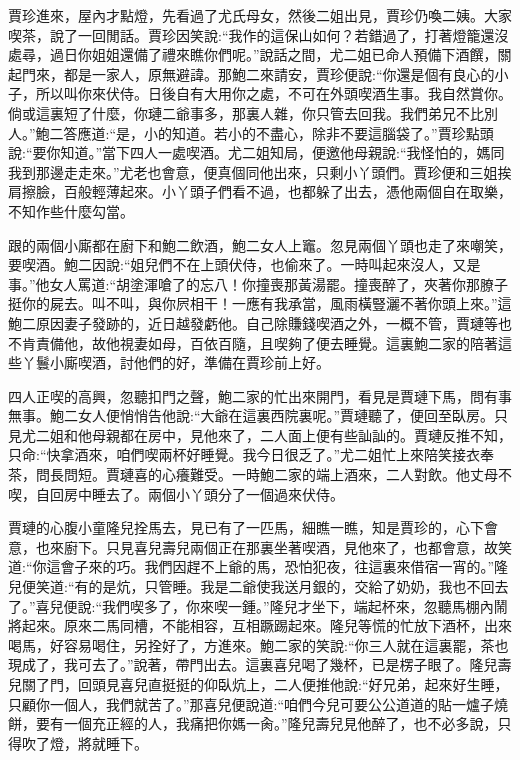 \begin{parag}
    賈珍進來，屋內才點燈，先看過了尤氏母女，然後二姐出見，賈珍仍喚二姨。大家喫茶，說了一回閒話。賈珍因笑說:“我作的這保山如何？若錯過了，打著燈籠還沒處尋，過日你姐姐還備了禮來瞧你們呢。”說話之間，尤二姐已命人預備下酒饌，關起門來，都是一家人，原無避諱。那鮑二來請安，賈珍便說:“你還是個有良心的小子，所以叫你來伏侍。日後自有大用你之處，不可在外頭喫酒生事。我自然賞你。倘或這裏短了什麼，你璉二爺事多，那裏人雜，你只管去回我。我們弟兄不比別人。”鮑二答應道:“是，小的知道。若小的不盡心，除非不要這腦袋了。”賈珍點頭說:“要你知道。”當下四人一處喫酒。尤二姐知局，便邀他母親說:“我怪怕的，媽同我到那邊走走來。”尤老也會意，便真個同他出來，只剩小丫頭們。賈珍便和三姐挨肩擦臉，百般輕薄起來。小丫頭子們看不過，也都躲了出去，憑他兩個自在取樂，不知作些什麼勾當。
\end{parag}


\begin{parag}
    跟的兩個小廝都在廚下和鮑二飲酒，鮑二女人上竈。忽見兩個丫頭也走了來嘲笑，要喫酒。鮑二因說:“姐兒們不在上頭伏侍，也偷來了。一時叫起來沒人，又是事。”他女人罵道:“胡塗渾嗆了的忘八！你撞喪那黃湯罷。撞喪醉了，夾著你那膫子挺你的屍去。叫不叫，與你屄相干！一應有我承當，風雨橫豎灑不著你頭上來。”這鮑二原因妻子發跡的，近日越發虧他。自己除賺錢喫酒之外，一概不管，賈璉等也不肯責備他，故他視妻如母，百依百隨，且喫夠了便去睡覺。這裏鮑二家的陪著這些丫鬟小廝喫酒，討他們的好，準備在賈珍前上好。
\end{parag}


\begin{parag}
    四人正喫的高興，忽聽扣門之聲，鮑二家的忙出來開門，看見是賈璉下馬，問有事無事。鮑二女人便悄悄告他說:“大爺在這裏西院裏呢。”賈璉聽了，便回至臥房。只見尤二姐和他母親都在房中，見他來了，二人面上便有些訕訕的。賈璉反推不知，只命:“快拿酒來，咱們喫兩杯好睡覺。我今日很乏了。”尤二姐忙上來陪笑接衣奉茶，問長問短。賈璉喜的心癢難受。一時鮑二家的端上酒來，二人對飲。他丈母不喫，自回房中睡去了。兩個小丫頭分了一個過來伏侍。
\end{parag}


\begin{parag}
    賈璉的心腹小童隆兒拴馬去，見已有了一匹馬，細瞧一瞧，知是賈珍的，心下會意，也來廚下。只見喜兒壽兒兩個正在那裏坐著喫酒，見他來了，也都會意，故笑道:“你這會子來的巧。我們因趕不上爺的馬，恐怕犯夜，往這裏來借宿一宵的。”隆兒便笑道:“有的是炕，只管睡。我是二爺使我送月銀的，交給了奶奶，我也不回去了。”喜兒便說:“我們喫多了，你來喫一鍾。”隆兒才坐下，端起杯來，忽聽馬棚內鬧將起來。原來二馬同槽，不能相容，互相蹶踢起來。隆兒等慌的忙放下酒杯，出來喝馬，好容易喝住，另拴好了，方進來。鮑二家的笑說:“你三人就在這裏罷，茶也現成了，我可去了。”說著，帶門出去。這裏喜兒喝了幾杯，已是楞子眼了。隆兒壽兒關了門，回頭見喜兒直挺挺的仰臥炕上，二人便推他說:“好兄弟，起來好生睡，只顧你一個人，我們就苦了。”那喜兒便說道:“咱們今兒可要公公道道的貼一爐子燒餅，要有一個充正經的人，我痛把你媽一肏。”隆兒壽兒見他醉了，也不必多說，只得吹了燈，將就睡下。
\end{parag}


